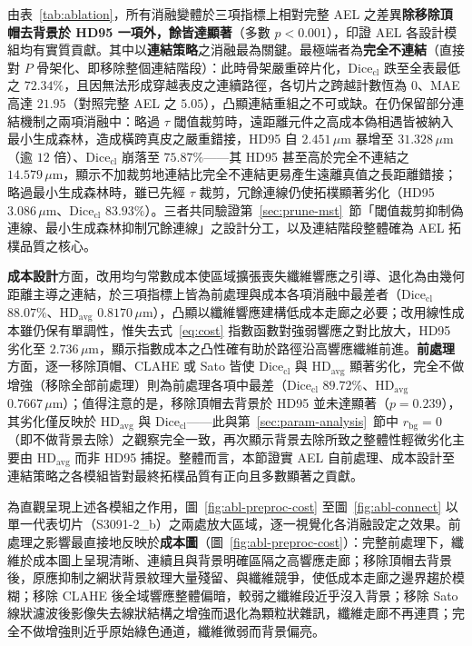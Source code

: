 由表~\ref{tab:ablation}，所有消融變體於三項指標上相對完整 AEL 之差異\textbf{除移除頂帽去背景於 HD95 一項外，餘皆達顯著}（多數 $p < 0.001$），印證 AEL 各設計模組均有實質貢獻。其中以\textbf{連結策略}之消融最為關鍵。最極端者為\textbf{完全不連結}（直接對 $P$ 骨架化、即移除整個連結階段）：此時骨架嚴重碎片化，$\text{Dice}_{\text{cl}}$ 跌至全表最低之 $72.34\%$，且因無法形成穿越表皮之連續路徑，各切片之跨越計數恆為 $0$、MAE 高達 $21.95$（對照完整 AEL 之 $5.05$），凸顯連結重組之不可或缺。在仍保留部分連結機制之兩項消融中：略過 $\tau$ 閾值裁剪時，遠距離元件之高成本偽相遇皆被納入最小生成森林，造成橫跨真皮之嚴重錯接，HD95 自 $2.451\,\mu\text{m}$ 暴增至 $31.328\,\mu\text{m}$（逾 $12$ 倍）、$\text{Dice}_{\text{cl}}$ 崩落至 $75.87\%$——其 HD95 甚至高於完全不連結之 $14.579\,\mu\text{m}$，顯示不加裁剪地連結比完全不連結更易產生遠離真值之長距離錯接；略過最小生成森林時，雖已先經 $\tau$ 裁剪，冗餘連線仍使拓樸顯著劣化（HD95 $3.086\,\mu\text{m}$、$\text{Dice}_{\text{cl}}$ $83.93\%$）。三者共同驗證第~\ref{sec:prune-mst}~節「閾值裁剪抑制偽連線、最小生成森林抑制冗餘連線」之設計分工，以及連結階段整體確為 AEL 拓樸品質之核心。

\textbf{成本設計}方面，改用均勻常數成本使區域擴張喪失纖維響應之引導、退化為由幾何距離主導之連結，於三項指標上皆為前處理與成本各項消融中最差者（$\text{Dice}_{\text{cl}}$ $88.07\%$、$\text{HD}_{\text{avg}}$ $0.8170\,\mu\text{m}$），凸顯以纖維響應建構低成本走廊之必要；改用線性成本雖仍保有單調性，惟失去式~\eqref{eq:cost} 指數函數對強弱響應之對比放大，HD95 劣化至 $2.736\,\mu\text{m}$，顯示指數成本之凸性確有助於路徑沿高響應纖維前進。\textbf{前處理}方面，逐一移除頂帽、CLAHE 或 Sato 皆使 $\text{Dice}_{\text{cl}}$ 與 $\text{HD}_{\text{avg}}$ 顯著劣化，完全不做增強（移除全部前處理）則為前處理各項中最差（$\text{Dice}_{\text{cl}}$ $89.72\%$、$\text{HD}_{\text{avg}}$ $0.7667\,\mu\text{m}$）；值得注意的是，移除頂帽去背景於 HD95 並未達顯著（$p = 0.239$），其劣化僅反映於 $\text{HD}_{\text{avg}}$ 與 $\text{Dice}_{\text{cl}}$——此與第~\ref{sec:param-analysis}~節中 $r_{\text{bg}} = 0$（即不做背景去除）之觀察完全一致，再次顯示背景去除所致之整體性輕微劣化主要由 $\text{HD}_{\text{avg}}$ 而非 HD95 捕捉。整體而言，本節證實 AEL 自前處理、成本設計至連結策略之各模組皆對最終拓樸品質有正向且多數顯著之貢獻。

為直觀呈現上述各模組之作用，圖~\ref{fig:abl-preproc-cost} 至圖~\ref{fig:abl-connect} 以單一代表切片（S3091-2\_b）之兩處放大區域，逐一視覺化各消融設定之效果。前處理之影響最直接地反映於\textbf{成本圖}（圖~\ref{fig:abl-preproc-cost}）：完整前處理下，纖維於成本圖上呈現清晰、連續且與背景明確區隔之高響應走廊；移除頂帽去背景後，原應抑制之網狀背景紋理大量殘留、與纖維競爭，使低成本走廊之邊界趨於模糊；移除 CLAHE 後全域響應整體偏暗，較弱之纖維段近乎沒入背景；移除 Sato 線狀濾波後影像失去線狀結構之增強而退化為顆粒狀雜訊，纖維走廊不再連貫；完全不做增強則近乎原始綠色通道，纖維微弱而背景偏亮。

